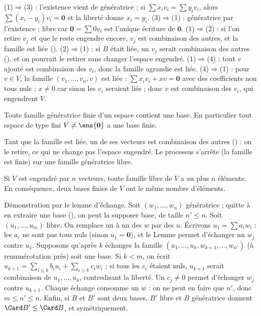 \begin{preuve}
(1)$\Rightarrow$(3) : l'existence vient de \og génératrice \fg ; si $\sum x_iv_i=\sum y_iv_i$, alors $\sum(x_i-y_i)v_i=\mathbf 0$ et la liberté donne $x_i=y_i$.
(3)$\Rightarrow$(1) : génératrice par l'existence ; libre car $\mathbf 0=\sum0v_i$ est l'unique écriture de $\mathbf 0$.
(1)$\Rightarrow$(2) : si l'on retire $v_j$ et que le reste engendre encore, $v_j$ est combinaison des autres, et la famille est liée (). (2)$\Rightarrow$(1) : si $B$ était liée, un $v_j$ serait combinaison des autres (), et on pourrait le retirer sans changer l'espace engendré.
(1)$\Rightarrow$(4) : tout $v$ ajouté est combinaison des $v_i$, donc la famille agrandie est liée. (4)$\Rightarrow$(1) : pour $v\in V$, la famille $(v_1,\dots,v_n,v)$ est liée : $\sum x_iv_i+xv=\mathbf 0$ avec des coefficients non tous nuls ; $x\neq0$ car sinon les $v_i$ seraient liés ; donc $v$ est combinaison des $v_i$, qui engendrent $V$.
\end{preuve}
\begin{corollaire}\label{cor-extraire}
Toute famille génératrice finie d'un espace contient une base. En particulier tout espace de type fini $V\neq\ens{\mathbf 0}$ a une base finie.
\end{corollaire}
\begin{preuve}
Tant que la famille est liée, un de ses vecteurs est combinaison des autres () : on le retire, ce qui ne change pas l'espace engendré. Le processus s'arrête (la famille est finie) sur une famille génératrice libre.
\end{preuve}
\begin{theoreme}\label{thm-steinitz}
Si $V$ est engendré par $n$ vecteurs, toute famille libre de $V$ a au plus $n$ éléments. En conséquence, deux bases finies de $V$ ont le même nombre d'éléments.
\end{theoreme}
\begin{preuve}
Démonstration par le lemme d'échange. Soit $(w_1,\dots,w_n)$ génératrice ; quitte à en extraire une base (), on peut la supposer base, de taille $n'\le n$. Soit $(u_1,\dots,u_m)$ libre. On remplace un à un des $w$ par des $u$. Écrivons $u_1=\sum a_iw_i$ : les $a_i$ ne sont pas tous nuls (sinon $u_1=\mathbf 0$), et le Lemme  permet d'échanger un $w_j$ contre $u_1$. Supposons qu'après $k$ échanges la famille $(u_1,\dots,u_k,w_{k+1},\dots,w_{n'})$ (à renumérotation près) soit une base. Si $k<m$, on écrit $u_{k+1}=\sum_{i\le k}b_iu_i+\sum_{i>k}c_iw_i$ ; si tous les $c_i$ étaient nuls, $u_{k+1}$ serait combinaison de $u_1,\dots,u_k$, contredisant la liberté. Un $c_j\neq0$ permet d'échanger $w_j$ contre $u_{k+1}$. Chaque échange consomme un $w$ : on ne peut en faire que $n'$, donc $m\le n'\le n$. Enfin, si $B$ et $B'$ sont deux bases, $B'$ libre et $B$ génératrice donnent $\Card B'\le\Card B$, et symétriquement.
\end{preuve}
